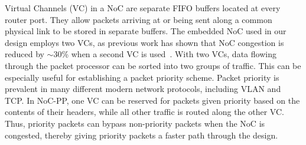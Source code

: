%
%


Virtual Channels (VC) in a NoC are separate FIFO buffers located at every router port.
They allow packets arriving at or being sent along a common physical link to be stored in separate buffers.
The embedded NoC used in our design employs two VCs, as previous work has shown that NoC congestion is reduced by $\sim$30\% when a second VC is used~\cite{fpl}.
With two VCs, data flowing through the packet processor can be sorted into two groups of traffic.
This can be especially useful for establishing a packet priority scheme.
Packet priority is prevalent in many different modern network protocols, including VLAN and TCP.
In NoC-PP, one VC can be reserved for packets given priority based on the contents of their headers, while all other traffic is routed along the other VC.
Thus, priority packets can bypass non-priority packets when the NoC is congested, thereby giving priority packets a faster path through the design.


